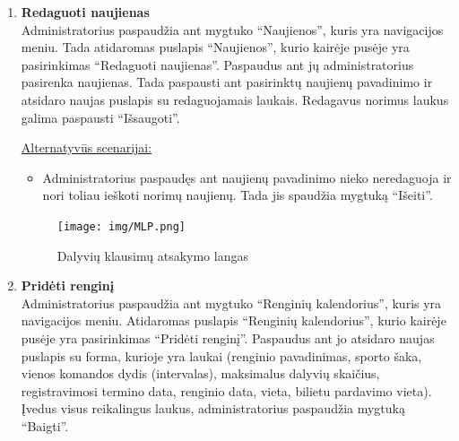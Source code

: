 \documentclass{VUMIFPSkursinis}
\begin{document}
\begin{enumerate} [label = \textbf{U\arabic*.}]
					\underline{Alternatyvūs scenarijai:}
					\begin{itemize}
						\item Administratoriui pasirinkus opciją pasirinkti iš sąrašo. Prie esančių puslapio “Naujienos” naujienų atsiranda varnelės opcija, pažymėjus varneles kairėje pusėje galima paspausti mygtuką “Ištrinti”.
						\item Administratoriui suvedus netinkamą pavadinimą, kai pasirinktas pasirinkimas įvesti naujienų pavadinimą, atsirandą užrašas “Tokių naujienų nėra.”
					\end{itemize}
				
				\begin{figure}[H]
					\centering
					\texttt{[image: img/MLP.png]}
					\caption{Dalyvių klausimų atsakymo langas}
					\label{fig:atsakyti-klausimus}
				\end{figure}
					
			\item \textbf{Redaguoti naujienas}   \\
					Administratorius paspaudžia  ant mygtuko “Naujienos”, kuris yra navigacijos meniu. Tada atidaromas puslapis “Naujienos”, kurio kairėje pusėje yra pasirinkimas “Redaguoti naujienas”. Paspaudus ant jų administratorius pasirenka naujienas. Tada paspausti ant pasirinktų naujienų pavadinimo ir atsidaro naujas puslapis su redaguojamais laukais. Redagavus norimus laukus galima paspausti “Išsaugoti”.
					
					\underline{Alternatyvūs scenarijai:}
					\begin{itemize}
						\item Administratorius paspaudęs ant naujienų pavadinimo nieko neredaguoja ir nori toliau ieškoti norimų naujienų. Tada jis spaudžia mygtuką “Išeiti”.
					\end{itemize}
				
				\begin{figure}[H]
					\centering
					\texttt{[image: img/MLP.png]}
					\caption{Dalyvių klausimų atsakymo langas}
					\label{fig:atsakyti-klausimus}
				\end{figure}
				
			\item \textbf{Pridėti renginį}   \\
					Administratorius paspaudžia ant mygtuko “Renginių kalendorius”, kuris yra navigacijos meniu. Atidaromas puslapis “Renginių kalendorius”, kurio kairėje pusėje yra pasirinkimas “Pridėti renginį”. Paspaudus ant jo atsidaro naujas puslapis su forma, kurioje yra laukai (renginio pavadinimas, sporto šaka, vienos komandos dydis (intervalas), maksimalus dalyvių skaičius, registravimosi termino data, renginio data, vieta, bilietu pardavimo vieta). Įvedus visus reikalingus laukus, administratorius paspaudžia mygtuką “Baigti”.
					

\end{enumerate}
\end{document}
